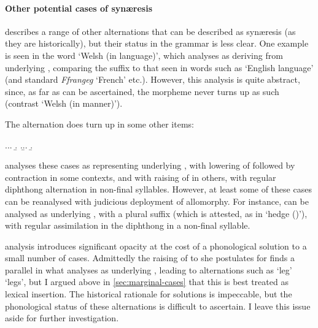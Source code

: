 \paragraph{Other potential cases of synæresis}
\label{sec:other-potent-cases}

\citet{awbery86:_pembr_welsh} describes a range of other alternations that can be described as synæresis (as they are historically), but their status in the grammar is less clear. One example is seen in the word \ipa{[kumˈraːɡ]} `Welsh (in language)', which \citeauthor{awbery86:_pembr_welsh} analyses as deriving from underlying , comparing the suffix to that seen in words such as \ipa{[ˈsisneɡ]} `English language' (and \cf standard \emph{Ffrangeg} `French' etc.). However, this analysis is quite abstract, since, as far as can be ascertained, the morpheme  never turns up as such (contrast \ipa{[kumˈreiɡeð]} `Welsh (in manner)').

The \alternation{[aː]}{[ei]} alternation does turn up in some other items:

\ex.\a.\a.
\b.
\z.\b.\a.
\b.

\citet{awbery86:_pembr_welsh} analyses these cases as representing underlying , with lowering of \ipa{[e]} followed by contraction in some contexts, and with raising of \ipa{[e]} in others, with regular diphthong alternation in non-final syllables. However, at least some of these cases can be reanalysed with judicious deployment of allomorphy. For instance, \alternation{[ˈkaː]}{[ˈkeie]} can be analysed as underlying , with a plural suffix  (which is attested, as in \alternation{[ˈklau]}{[ˈkloðje]} `hedge ()'), with regular assimilation in the  diphthong in a non-final syllable.

 analysis introduces significant opacity at the cost of a phonological solution to a small number of cases. Admittedly the raising of \ipa{[e]} to \ipa{[i]} she postulates for  finds a parallel in what \citeauthor{awbery86:_pembr_welsh} analyses as underlying , leading to alternations such as \ipa{[ˈkuːes]} `leg' \vs\ \ipa{[ˈkoise]} `legs', but I argued above in \cref{sec:marginal-cases} that this is best treated as lexical insertion. The historical rationale for  solutions is impeccable, but the phonological status of these alternations is difficult to ascertain. I leave this issue aside for further investigation.

